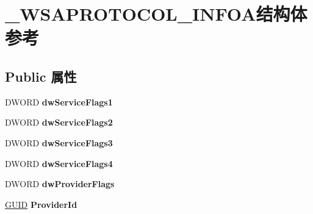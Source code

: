 \hypertarget{struct___w_s_a_p_r_o_t_o_c_o_l___i_n_f_o_a}{}\section{\+\_\+\+W\+S\+A\+P\+R\+O\+T\+O\+C\+O\+L\+\_\+\+I\+N\+F\+O\+A结构体 参考}
\label{struct___w_s_a_p_r_o_t_o_c_o_l___i_n_f_o_a}
\subsection*{Public 属性}
\begin{DoxyCompactItemize}
\item 
\mbox{\label{struct___w_s_a_p_r_o_t_o_c_o_l___i_n_f_o_a_a64555919e9ddcb7c90945d481e1669d6}} 
D\+W\+O\+RD {\bfseries dw\+Service\+Flags1}
\item 
\mbox{\label{struct___w_s_a_p_r_o_t_o_c_o_l___i_n_f_o_a_a3f688be6826501908eb723680721110e}} 
D\+W\+O\+RD {\bfseries dw\+Service\+Flags2}
\item 
\mbox{\label{struct___w_s_a_p_r_o_t_o_c_o_l___i_n_f_o_a_aae1f932195f031cd12ef9433b1ab9249}} 
D\+W\+O\+RD {\bfseries dw\+Service\+Flags3}
\item 
\mbox{\label{struct___w_s_a_p_r_o_t_o_c_o_l___i_n_f_o_a_a674046ef971346e9f55b0865c5d5954c}} 
D\+W\+O\+RD {\bfseries dw\+Service\+Flags4}
\item 
\mbox{\label{struct___w_s_a_p_r_o_t_o_c_o_l___i_n_f_o_a_aabeb674fd6ebdc5f9d2ac4968b1e19c7}} 
D\+W\+O\+RD {\bfseries dw\+Provider\+Flags}
\item 
\mbox{\label{struct___w_s_a_p_r_o_t_o_c_o_l___i_n_f_o_a_a6f3b5d2b4df109449fd60a7d8dfb1868}} 
\hyperlink{interface_g_u_i_d}{G\+U\+ID} {\bfseries Provider\+Id}
\item 
\mbox{\label{struct___w_s_a_p_r_o_t_o_c_o_l___i_n_f_o_a_aafadea6b66c643d971226107d319d8ac}} 

\end{DoxyCompactItemize}

